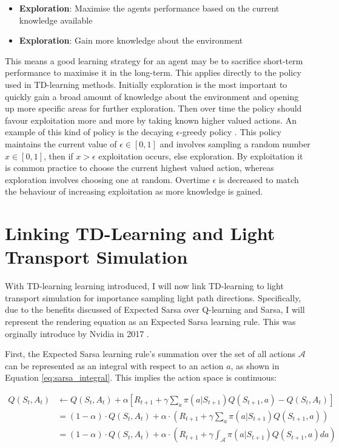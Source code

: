 \documentclass[ %
                    author={Callum Pearce},
                supervisor={Dr. Neill Campbell},
                    degree={MEng},
                     title={How effective are Temporal difference learning methods for reducing the number of zero contribution light paths while still accurately approximating Global Illumination in Path tracing?},
                  subtitle={},
                      type={research},
                      year={2019} ]{dissertation}
\begin{document}
\begin{itemize}
\item \textbf{Exploration}: Maximise the agents performance based on the current knowledge available
\item \textbf{Exploration}: Gain more knowledge about the environment
\end{itemize}

This means a good learning strategy for an agent may be to sacrifice short-term performance to maximise it in the long-term. This applies directly to the policy used in TD-learning methods. Initially exploration is the most important to quickly gain a broad amount of knowledge about the environment and opening up more specific areas for further exploration. Then over time the policy should favour exploitation more and more by taking known higher valued actions. An example of this kind of policy is the decaying $\epsilon$-greedy policy \cite{sutton2011reinforcement}. This policy maintains the current value of $\epsilon \in [0,1]$ and involves sampling a random number $x \in [0,1]$, then if $x > \epsilon$ exploitation occurs, else exploration. By exploitation it is common practice to choose the current highest valued action, whereas exploration involves choosing one at random. Overtime $\epsilon$ is decreased to match the behaviour of increasing exploitation as more knowledge is gained.

\section{Linking TD-Learning and Light Transport Simulation}
\label{sec:td_light_transport}
With TD-learning learning introduced, I will now link TD-learning to light transport simulation for importance sampling light path directions. Specifically, due to the benefits discussed of Expected Sarsa over Q-learning and Sarsa, I will represent the rendering equation as an Expected Sarsa learning rule. This was orginally introduce by Nvidia in 2017 \cite{dahm2017learning}. 

First, the Expected Sarsa learning rule's summation over the set of all actions $\mathcal{A}$ can be represented as an integral with respect to an action $a$, as shown in Equation \ref{eq:sarsa_integral}. This implies the action space is continuous:

\begin{align}
Q(S_t, A_t) & \leftarrow Q(S_t, A_t) + \alpha [R_{t+1} + \gamma \sum_a \pi(a| S_{t+1}) Q(S_{t+1}, a) - Q(S_t, A_t)]\\
& =  (1 - \alpha) \cdot Q(S_{t},A_t) + \alpha \cdot \left( R_{t+1} + \gamma \sum_a \pi(a|S_{t+1}) Q(S_{t+1}, a) \right)\\
& = (1 - \alpha) \cdot Q(S_{t},A_t) + \alpha \cdot \left( R_{t+1} + \gamma \int_\mathcal{A} \pi(a|S_{t+1}) Q(S_{t+1}, a) da \right)
 \label{eq:sarsa_integral}
\end{align}
\end{document}
